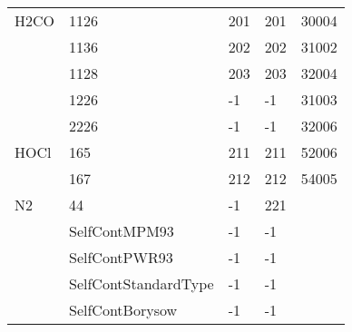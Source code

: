 \begin{longtable}{lllll}
\hline                  
  H2CO& 1126&  201&   201&  30004\\
      & 1136&  202&   202&  31002\\
      & 1128&  203&   203&  32004\\
      & 1226&  -1&    -1&  31003\\
      & 2226&  -1&    -1&  32006\\
\hline                  
  HOCl& 165&  211&   211&  52006\\
      & 167&  212&   212&  54005\\
\hline                  
  N2& 44&  -1&   221&\\
    &SelfContMPM93&             -1      &-1     \\
    &SelfContPWR93&             -1      &-1     \\
    &SelfContStandardType&      -1      &-1     \\
    &SelfContBorysow&           -1      &-1     \\




\end{longtable}
